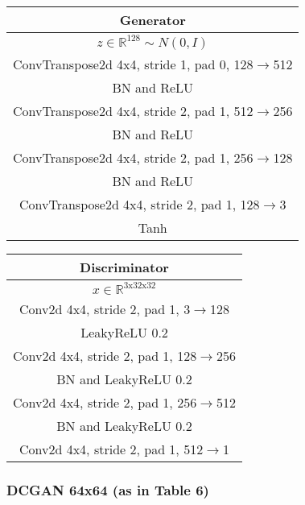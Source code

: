 \documentclass{article}
\begin{document}
\begin{center}
\begin{tabular}{c}
	Generator \\
	\toprule\midrule
	$z \in \mathbb{R}^{128} \sim N(0,I)$ \\
	\midrule
	ConvTranspose2d 4x4, stride 1, pad 0, 128$\to$512 \\
	\midrule
	BN and ReLU \\
	\midrule
	ConvTranspose2d 4x4, stride 2, pad 1, 512$\to$256 \\
	\midrule
	BN and ReLU \\
	\midrule
	ConvTranspose2d 4x4, stride 2, pad 1, 256$\to$128 \\
	\midrule
	BN and ReLU \\
	\midrule
	ConvTranspose2d 4x4, stride 2, pad 1, 128$\to$3 \\
	\midrule
	Tanh \\
	\bottomrule
\end{tabular} 
\end{center}
\begin{center}
\begin{tabular}{c}
	Discriminator \\
	\toprule\midrule
	$x \in \mathbb{R}^{\text{3x32x32}}$ \\
	\midrule
	Conv2d 4x4, stride 2, pad 1, 3$\to$128 \\
	\midrule
	LeakyReLU 0.2 \\
	\midrule
	Conv2d 4x4, stride 2, pad 1, 128$\to$256 \\
	\midrule
	BN and LeakyReLU 0.2 \\
	\midrule
	Conv2d 4x4, stride 2, pad 1, 256$\to$512 \\
	\midrule
	BN and LeakyReLU 0.2 \\
	\midrule
	Conv2d 4x4, stride 2, pad 1, 512$\to$1 \\
	\bottomrule
\end{tabular}
\end{center}

\subsubsection{DCGAN 64x64 (as in Table 6)}
\end{document}
